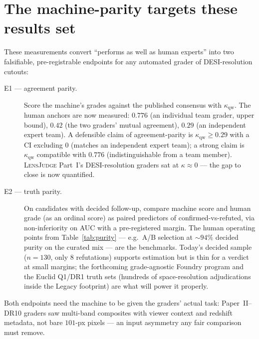 \documentclass[11pt,letterpaper]{article}
\newcommand{\lj}{\textsc{LensJudge}}
\newcommand{\qwk}{\ensuremath{\kappa_{\mathrm{qw}}}}
\begin{document}
\section{The machine-parity targets these results set}\label{sec:targets}
These measurements convert ``performs as well as human experts'' into two falsifiable,
pre-registrable endpoints for any automated grader of DESI-resolution cutouts:

\begin{description}
\item[E1 --- agreement parity.] Score the machine's grades against the published consensus with
\qwk{}. The human anchors are now measured: $0.776$ (an individual team grader, upper bound),
$0.42$ (the two graders' mutual agreement), $0.29$ (an independent expert team). A defensible
claim of agreement-parity is $\qwk \geq 0.29$ with a CI excluding $0$ (matches an independent
expert team); a strong claim is $\qwk$ compatible with $0.776$ (indistinguishable from a team
member). \lj{} Part~I's DESI-resolution graders sat at $\kappa\approx0$ --- the gap to close is
now quantified.
\item[E2 --- truth parity.] On candidates with decided follow-up, compare machine score and
human grade (as an ordinal score) as paired predictors of confirmed-vs-refuted, via
non-inferiority on AUC with a pre-registered margin. The human operating points from
Table~\ref{tab:purity} --- e.g.\ A/B selection at $\sim$$94\%$ decided purity on the curated mix
--- are the benchmarks. Today's decided sample ($n=130$, only $8$ refutations) supports
estimation but is thin for a verdict at small margins; the forthcoming grade-agnostic Foundry
program and the Euclid Q1/DR1 truth sets (hundreds of space-resolution adjudications inside the
Legacy footprint) are what will power it properly.
\end{description}

Both endpoints need the machine to be given the graders' actual task: Paper~II--DR10 graders saw
multi-band composites with viewer context and redshift metadata, not bare $101$-px pixels ---
an input asymmetry any fair comparison must remove.
\end{document}
